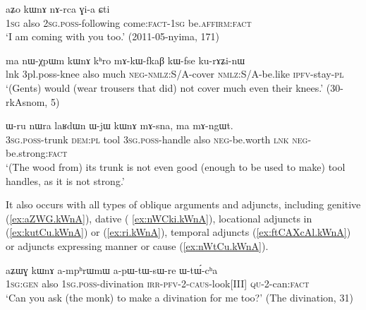  \begin{exe}
\ex \label{ex:kWnA.nArca}
\gll aʑo kɯnɤ nɤ-rca ɣi-a ɕti  \\
\textsc{1sg} also \textsc{2sg}.\textsc{poss}-following come:\textsc{fact}-\textsc{1sg} be.\textsc{affirm}:\textsc{fact} \\
\glt `I am coming with you too.' (2011-05-nyima, 171)
 \end{exe}
 
   \begin{exe}
\ex \label{ex:nWXpWm.kWnA}
\gll    ma nɯ-χpɯm kɯnɤ kʰro mɤ-kɯ-fkaβ kɯ-fse ku-rɤʑi-nɯ  \\
lnk 3pl.poss-knee also much \textsc{neg}-\textsc{nmlz}:S/A-cover \textsc{nmlz}:S/A-be.like \textsc{ipfv}-stay-\textsc{pl} \\
\glt `(Gents) would (wear trousers that did) not cover much even their knees.'  (30-rkAsnom, 5) 
  \end{exe}
  
  \begin{exe}
 \ex \label{ex:kWnA.mAsna}
 \gll   ɯ-ru nɯra laʁdɯn ɯ-jɯ kɯnɤ mɤ-sna, ma mɤ-ngɯt. \\
 \textsc{3sg}.\textsc{poss}-trunk \textsc{dem}:\textsc{pl} tool \textsc{3sg}.\textsc{poss}-handle also \textsc{neg}-be.worth \textsc{lnk}  \textsc{neg}-be.strong:\textsc{fact} \\
 \glt `(The wood from) its trunk is not even good (enough to be used to make) tool handles, as it is not strong.' 
  \end{exe}

It also occurs with all types of oblique arguments and adjuncts, including genitive (\ref{ex:aZWG.kWnA}), dative ( \ref{ex:nWCki.kWnA}),  locational adjuncts in  (\ref{ex:kutCu.kWnA}) or  (\ref{ex:ri.kWnA}), temporal adjuncts (\ref{ex:ftCAXcAl.kWnA}) or adjuncts expressing manner or cause (\ref{ex:nWtCu.kWnA}).  
  
   \begin{exe}
\ex \label{ex:aZWG.kWnA}
\gll aʑɯɣ kɯnɤ a-mpʰrɯmɯ a-pɯ-tɯ-sɯ-re ɯ-tɯ́-cʰa \\
\textsc{1sg}:\textsc{gen} also \textsc{1sg}.\textsc{poss}-divination \textsc{irr}-\textsc{pfv}-2-\textsc{caus}-look[III] \textsc{qu}-2-can:\textsc{fact} \\
\glt `Can you ask (the monk) to make a divination for me too?' (The divination, 31)
\end{exe}  
  
